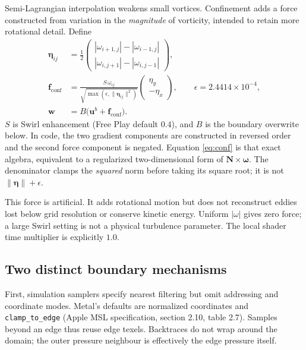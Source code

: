 \documentclass[11pt,a4paper]{article}
\newcommand{\uvec}{\mathbf{u}}
\newcommand{\code}[1]{\texttt{#1}}
\begin{document}
Semi-Lagrangian interpolation weakens small vortices. Confinement adds a force
constructed from variation in the \emph{magnitude} of vorticity, intended to
retain more rotational detail. Define
\begin{align}
 \boldsymbol\eta_{ij}
 &=\tfrac12\begin{pmatrix}
 |\omega_{i+1,j}|-|\omega_{i-1,j}|\\
 |\omega_{i,j+1}|-|\omega_{i,j-1}|
 \end{pmatrix},\\
 \mathbf f_{\mathrm{conf}}
 &=\frac{S\,\omega_{ij}}{\sqrt{\max(\epsilon,\|\boldsymbol\eta_{ij}\|^2)}}
 \begin{pmatrix}\eta_y\\-\eta_x\end{pmatrix},
 \qquad\epsilon=2.4414\times10^{-4},\label{eq:conf}\\
 \mathbf w&=B\bigl(\uvec^b+\mathbf f_{\mathrm{conf}}\bigr).
\end{align}
$S$ is Swirl enhancement (Free Play default $0.4$), and $B$ is the boundary overwrite below. In code,
the two gradient components are constructed in reversed order and the second
force component is negated. Equation \eqref{eq:conf} is that exact algebra,
equivalent to a regularized two-dimensional form of $\mathbf N\times\boldsymbol\omega$.
The denominator clamps the \emph{squared} norm before taking its square root;
it is not $\|\boldsymbol\eta\|+\epsilon$.

This force is artificial. It adds rotational motion but does not reconstruct
eddies lost below grid resolution or conserve kinetic energy. Uniform
$|\omega|$ gives zero force; a large Swirl setting is not a physical turbulence
parameter. The local shader time multiplier is explicitly $1.0$.

\subsection*{Two distinct boundary mechanisms}
First, simulation samplers specify nearest filtering but omit addressing and
coordinate modes. Metal's defaults are normalized coordinates and
\code{clamp\_to\_edge} (Apple MSL specification, section 2.10, table 2.7).
Samples beyond an edge thus reuse edge texels. Backtraces do not wrap around the
domain; the outer pressure neighbour is effectively the edge pressure itself.
\end{document}
